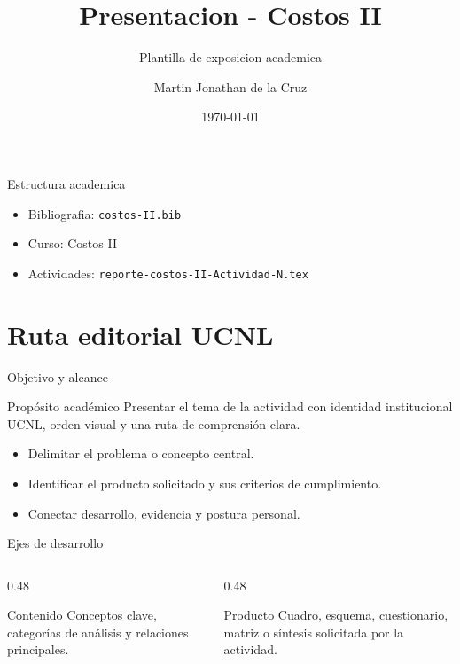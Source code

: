 ﻿\documentclass[spanish,aspectratio=169]{beamer}
\title{Presentacion - Costos II}
\subtitle{Plantilla de exposicion academica}
\author{Martin Jonathan de la Cruz}
\institute{Universidad Ciudadana de Nuevo Leon}
\date{\today}
\begin{document}
\begin{frame}
  \titlepage
\end{frame}

\begin{frame}{Estructura academica}
  \begin{itemize}
    \item Bibliografia: \texttt{costos-II.bib}
    \item Curso: Costos II
    \item Actividades: \texttt{reporte-costos-II-Actividad-N.tex}
  \end{itemize}
\end{frame}


\section{Ruta editorial UCNL}

\begin{frame}{Objetivo y alcance}
  \begin{block}{Propósito académico}
    Presentar el tema de la actividad con identidad institucional UCNL, orden visual y una ruta de comprensión clara.
  \end{block}
  \begin{itemize}
    \item Delimitar el problema o concepto central.
    \item Identificar el producto solicitado y sus criterios de cumplimiento.
    \item Conectar desarrollo, evidencia y postura personal.
  \end{itemize}
\end{frame}

\begin{frame}{Ejes de desarrollo}
  \begin{columns}[T,totalwidth=\textwidth]
    \begin{column}{0.48\textwidth}
      \begin{block}{Contenido}
        Conceptos clave, categorías de análisis y relaciones principales.
      \end{block}
    \end{column}
    \begin{column}{0.48\textwidth}
      \begin{block}{Producto}
        Cuadro, esquema, cuestionario, matriz o síntesis solicitada por la actividad.
      \end{block}
    \end{column}
  \end{columns}
\end{frame}
\end{document}
